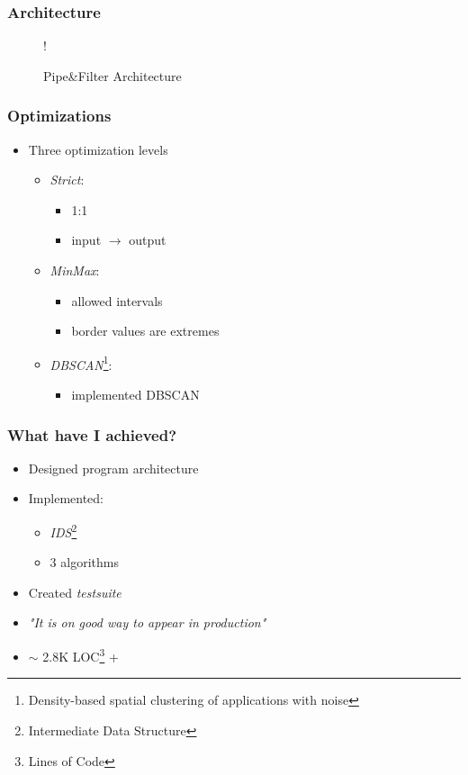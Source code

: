 \documentclass[10pt,xcolor=svgnames,pdflatex]{beamer}
\begin{document}
\begin{frame}\frametitle{Architecture}
  \begin{figure}[h]
  \centering
  \resizebox {\textwidth} {!} {
    
  }
  \caption{Pipe\&Filter Architecture}
  \label{fig:tikz:architecture}
\end{figure}
\end{frame}

\begin{frame}\frametitle{Optimizations}

  \begin{itemize}
    \item Three optimization levels
     \begin{itemize}
	    \item \emph{Strict}:
	    \begin{itemize}
	      \item 1:1
	      \item input $\rightarrow$ output
	    \end{itemize}
	    \item \emph{MinMax}:
	    \begin{itemize}
	      \item allowed intervals
	      \item border values are extremes
	    \end{itemize}
	    \item \emph{DBSCAN}\footnote{Density-based spatial clustering of applications with noise}:
	    \begin{itemize}
	      \item implemented DBSCAN\cite{Mahesh_Kumar2016, Schubert:2017:DRR:3129336.3068335}
	    \end{itemize}
	  \end{itemize}
  \end{itemize}

 
\end{frame}

\begin{frame}\frametitle{What have I achieved?}
    \begin{itemize}
    	\item Designed program architecture
    	\item Implemented:
    	\begin{itemize}
    		\item \emph{IDS}\footnote{Intermediate Data Structure}
    		\item 3 algorithms
    	\end{itemize}
    	\item Created \emph{testsuite}
    	\item \textit{"It is on good way to appear in production"}
    	\item $\sim$ 2.8K LOC\footnote{Lines of Code} + 
    \end{itemize}
\end{frame}
\end{document}
